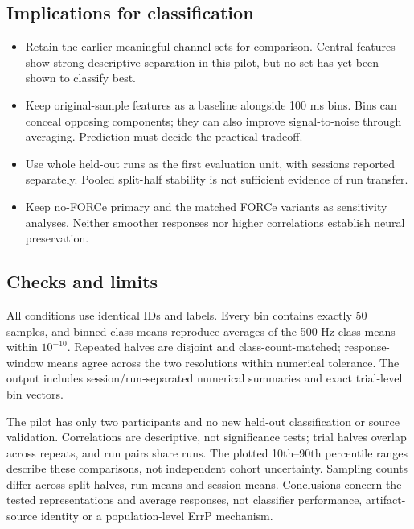 \documentclass[11pt,a4paper]{article}
\begin{document}
\subsection{Implications for classification}
\begin{itemize}
\item Retain the earlier meaningful channel sets for comparison. Central features show strong descriptive separation in this pilot, but no set has yet been shown to classify best.
\item Keep original-sample features as a baseline alongside 100 ms bins. Bins can conceal opposing components; they can also improve signal-to-noise through averaging. Prediction must decide the practical tradeoff.
\item Use whole held-out runs as the first evaluation unit, with sessions reported separately. Pooled split-half stability is not sufficient evidence of run transfer.
\item Keep no-FORCe primary and the matched FORCe variants as sensitivity analyses. Neither smoother responses nor higher correlations establish neural preservation.
\end{itemize}
\subsection{Checks and limits}
All conditions use identical IDs and labels. Every bin contains exactly 50 samples, and binned class means reproduce averages of the 500 Hz class means within $10^{-10}$. Repeated halves are disjoint and class-count-matched; response-window means agree across the two resolutions within numerical tolerance. The output includes session/run-separated numerical summaries and exact trial-level bin vectors.

The pilot has only two participants and no new held-out classification or source validation. Correlations are descriptive, not significance tests; trial halves overlap across repeats, and run pairs share runs. The plotted 10th--90th percentile ranges describe these comparisons, not independent cohort uncertainty. Sampling counts differ across split halves, run means and session means. Conclusions concern the tested representations and average responses, not classifier performance, artifact-source identity or a population-level ErrP mechanism.
\clearpage\appendix
\end{document}
